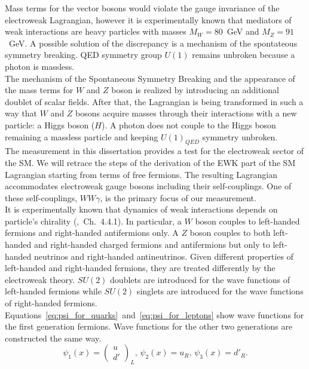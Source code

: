 Mass terms for the vector bosons would violate the gauge invariance of the electroweak Lagrangian, however it is experimentally known that mediators of weak interactions are heavy particles with masses $M_W=80$~GeV and $M_Z=91$~GeV. A possible solution of the discrepancy is a mechanism of the spontateous symmetry breaking. QED symmetry group $U(1)$ remains unbroken because a photon is massless.\\

The mechanism of the Spontaneous Symmetry Breaking and the appearance of the mass terms for $W$ and $Z$ boson is realized by introducing an additional doublet of scalar fields. After that, the Lagrangian is being transformed in such a way that $W$ and $Z$ bosons acquire masses through their interactions with a new particle: a Higgs boson ($H$). A photon does not couple to the Higgs boson remaining a massless particle and keeping $U(1)_{QED}$ symmetry unbroken.\\

The measurement in this dissertation provides a test for the electroweak sector of the SM. We will retrace the steps of the derivation of the EWK part of the SM Lagrangian starting from terms of free fermions. The resulting Lagrangian accommodates electroweak gauge bosons including their self-couplings. One of these self-couplings, $WW\gamma$, is the primary focus of our measurement.\\

It is experimentally known that dynamics of weak interactions depends on particle's chirality (\cite{ref_Griffiths},~Ch.~4.4.1). In particular, a $W$ boson couples to left-handed fermions and right-handed antifermions only. A $Z$ boson couples to both left-handed and right-handed charged fermions and antifermions but only to left-handed neutrinos and right-handed antineutrinos. Given different properties of left-handed and right-handed fermions, they are treated differently by the electroweak theory. $SU(2)$ doublets are introduced for the wave functions of left-handed fermions while $SU(2)$ singlets are introduced for the wave functions of right-handed fermions. Equations~\ref{eq:psi_for_quarks}~and~\ref{eq:psi_for_leptons} show wave functions for the first generation fermions. Wave functions for the other two generations are constructed the same way.\\ 
 
\begin{equation}\label{eq:psi_for_quarks}
\psi_1(x)=\begin{pmatrix} u \\ d' \end{pmatrix}_L \text{, } \psi_2(x)=u_R \text{, } \psi_3(x)=d'_R \text{.}
\end{equation}

